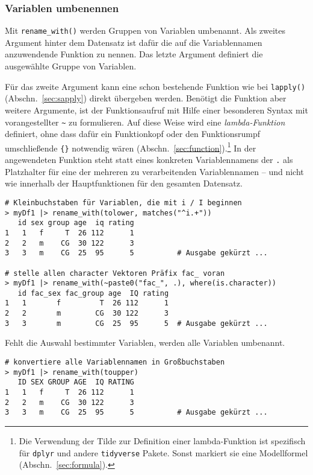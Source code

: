 \subsubsection{Variablen umbenennen}

Mit \lstinline!rename_with()! werden Gruppen von Variablen umbenannt. Als zweites Argument hinter dem Datensatz ist dafür die auf die Variablennamen anzuwendende Funktion zu nennen. Das letzte Argument definiert die ausgewählte Gruppe von Variablen.

Für das zweite Argument kann eine schon bestehende Funktion wie bei \lstinline!lapply()! (Abschn.\ \ref{sec:sapply}) direkt übergeben werden. Benötigt die Funktion aber weitere Argumente, ist der Funktionsaufruf mit Hilfe einer besonderen Syntax mit vorangestellter \lstinline!~! zu formulieren. Auf diese Weise wird eine \emph{lambda-Funktion} definiert, ohne dass dafür ein Funktionkopf oder den Funktionsrumpf umschließende \lstinline!{}! notwendig wären (Abschn.\ \ref{sec:function}).\footnote{Die Verwendung der Tilde zur Definition einer lambda-Funktion ist spezifisch für \lstinline!dplyr! und andere \lstinline!tidyverse! Pakete. Sonst markiert sie eine Modellformel (Abschn.\ \ref{sec:formula}).} In der angewendeten Funktion steht statt eines konkreten Variablennamens der \lstinline!.! als Platzhalter für eine der mehreren zu verarbeitenden Variablennamen -- und nicht wie innerhalb der Hauptfunktionen für den gesamten Datensatz.
\begin{lstlisting}
# Kleinbuchstaben für Variablen, die mit i / I beginnen
> myDf1 |> rename_with(tolower, matches("^i.+"))
   id sex group age  iq rating
1   1   f     T  26 112      1
2   2   m    CG  30 122      3
3   3   m    CG  25  95      5          # Ausgabe gekürzt ...

# stelle allen character Vektoren Präfix fac_ voran
> myDf1 |> rename_with(~paste0("fac_", .), where(is.character))
   id fac_sex fac_group age  IQ rating
1   1       f         T  26 112      1
2   2       m        CG  30 122      3
3   3       m        CG  25  95      5  # Ausgabe gekürzt ...
\end{lstlisting}

Fehlt die Auswahl bestimmter Variablen, werden alle Variablen umbenannt.
\begin{lstlisting}
# konvertiere alle Variablennamen in Großbuchstaben
> myDf1 |> rename_with(toupper)
   ID SEX GROUP AGE  IQ RATING
1   1   f     T  26 112      1
2   2   m    CG  30 122      3
3   3   m    CG  25  95      5          # Ausgabe gekürzt ...
\end{lstlisting}

